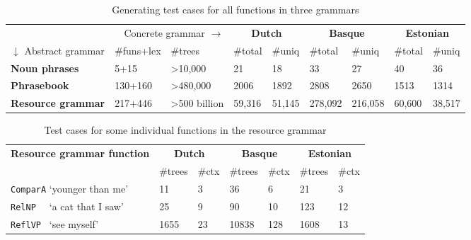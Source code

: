 \documentclass[11pt]{article}
\def\t#1{\texttt{#1}}
\begin{document}
\begin{table}[h]
\centering
\begin{tabular}{|lll|ll|ll|ll|}
\hline
\multicolumn{3}{|r}{Concrete grammar $\rightarrow$}              &
                                                                   \multicolumn{2}{|c}{\bf Dutch} & \multicolumn{2}{|c}{\bf Basque} & \multicolumn{2}{|c|}{\bf Estonian} \\
$\downarrow$ Abstract grammar & \#funs+lex & \#trees  &
                                                                 \#total & \#uniq & \#total & \#uniq  & \#total  & \#uniq \\ \hline
{\bf Noun phrases}     & 5+15          & \textgreater{}10,000          & 21    & 18     & 33      & 27      & 40       & 36     \\ \hline
{\bf Phrasebook}       & 130+160         & \textgreater{}480,000       & 2006  & 1892   & 2808    & 2650    & 1513     & 1314   \\ \hline
{\bf Resource grammar} & 217+446         & \textgreater{}500 billion   & 59,316 & 51,145  & 278,092  & 216,058  & 60,600    & 38,517   \\ \hline
\end{tabular}
\caption{Generating test cases for all functions in three grammars}
\label{results}
\end{table}

\begin{table}[h]
\centering
\begin{tabular}{|l|ll|ll|ll|}
\hline
{\bf Resource grammar function} &\multicolumn{2}{|c}{\bf Dutch} &
                                                                  \multicolumn{2}{|c}{\bf Basque} & \multicolumn{2}{|c|}{\bf Estonian} \\
                               &  \#trees & \#ctx &\#trees & \#ctx & \#trees & \#ctx  \\ \hline
\t{ComparA} `younger than me'  &  11      & 3     & 36     & 6     & 21      & 3   \\
\t{RelNP~~} `a cat that I saw' &  25      & 9     & 90     & 10    & 123     & 12 \\
 \t{ReflVP~} `see myself'      &  1655    & 23    & 10838  &  128  &1608     & 13   \\


\hline
\end{tabular}
\caption{Test cases for some individual functions in the resource grammar}
\label{results_indiv}
\end{table}
\end{document}
